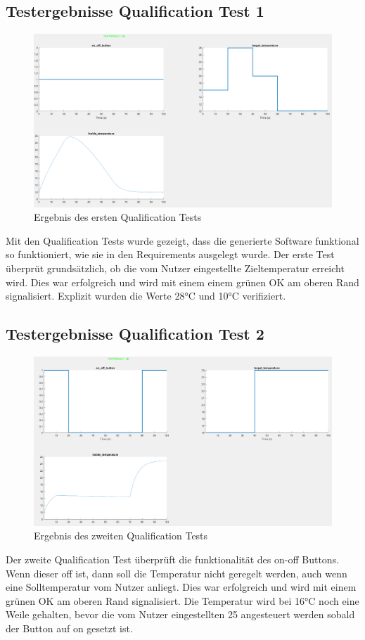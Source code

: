\documentclass[a4paper,12pt]{article}
\begin{document}
\subsection{Testergebnisse Qualification Test 1}
\begin{figure}[h!]
	\centering
	\includegraphics[width=\textwidth]{qualification_test_01.png}
	\caption{Ergebnis des ersten Qualification Tests}
\end{figure}
Mit den Qualification Tests wurde gezeigt, dass die generierte Software funktional so funktioniert, wie sie in den Requirements ausgelegt wurde. Der erste Test überprüt grundsätzlich, ob die vom Nutzer eingestellte Zieltemperatur erreicht wird. Dies war erfolgreich und wird mit einem einem grünen OK am oberen Rand signalisiert. Explizit wurden die Werte 28°C und 10°C verifiziert. 

\newpage

\subsection{Testergebnisse Qualification Test 2}
\begin{figure}[h!]
	\centering
	\includegraphics[width=\textwidth]{qualification_test_02.png}
	\caption{Ergebnis des zweiten Qualification Tests}
\end{figure}
Der zweite Qualification Test überprüft die funktionalität des on-off Buttons. Wenn dieser off ist, dann soll die Temperatur nicht geregelt werden, auch wenn eine Solltemperatur vom Nutzer anliegt. Dies war erfolgreich und wird mit einem grünen OK am oberen Rand signalisiert. Die Temperatur wird bei 16°C noch eine Weile gehalten, bevor die vom Nutzer eingestellten 25 angesteuert werden sobald der Button auf on gesetzt ist. 
\end{document}
